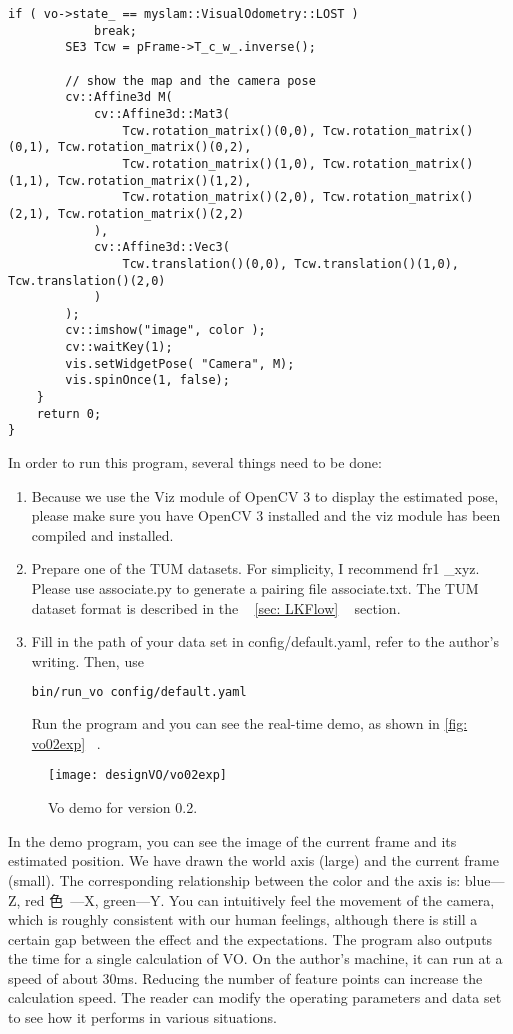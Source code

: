 \begin{lstlisting}[language = c ++, caption = slambook/project/0.2/test/run \_vo.cpp]
		if ( vo->state_ == myslam::VisualOdometry::LOST )
			break;
		SE3 Tcw = pFrame->T_c_w_.inverse();
		
		// show the map and the camera pose 
		cv::Affine3d M(
			cv::Affine3d::Mat3( 
				Tcw.rotation_matrix()(0,0), Tcw.rotation_matrix()(0,1), Tcw.rotation_matrix()(0,2),
				Tcw.rotation_matrix()(1,0), Tcw.rotation_matrix()(1,1), Tcw.rotation_matrix()(1,2),
				Tcw.rotation_matrix()(2,0), Tcw.rotation_matrix()(2,1), Tcw.rotation_matrix()(2,2)
			), 
			cv::Affine3d::Vec3(
				Tcw.translation()(0,0), Tcw.translation()(1,0), Tcw.translation()(2,0)
			)
		);
		cv::imshow("image", color );
		cv::waitKey(1);
		vis.setWidgetPose( "Camera", M);
		vis.spinOnce(1, false);
	}
	return 0;
}
\end{lstlisting}

In order to run this program, several things need to be done:

\begin{enumerate}
\item Because we use the Viz module of OpenCV 3 to display the estimated pose, please make sure you have OpenCV 3 installed and the viz module has been compiled and installed.
\item Prepare one of the TUM datasets. For simplicity, I recommend fr1 \_xyz. Please use associate.py to generate a pairing file associate.txt. The TUM dataset format is described in the ~ \ref{sec: LKFlow} ~ section.
\item Fill in the path of your data set in config/default.yaml, refer to the author's writing. Then, use
\begin{lstlisting}[language = sh]
bin/run_vo config/default.yaml
\end{lstlisting}
Run the program and you can see the real-time demo, as shown in \autoref{fig: vo02exp} ~.
\end{enumerate}

\begin{figure}[!htp]
\centering
\texttt{[image: designVO/vo02exp]} \\
\caption{Vo demo for version 0.2. }
\label{fig: vo02exp}
\end{figure}

In the demo program, you can see the image of the current frame and its estimated position. We have drawn the world axis (large) and the current frame (small). The corresponding relationship between the color and the axis is: blue—Z, red \mbox{色 —X}, green—Y. You can intuitively feel the movement of the camera, which is roughly consistent with our human feelings, although there is still a certain gap between the effect and the expectations. The program also outputs the time for a single calculation of VO. On the author's machine, it can run at a speed of about 30ms. Reducing the number of feature points can increase the calculation speed. The reader can modify the operating parameters and data set to see how it performs in various situations.

